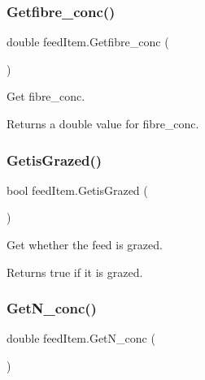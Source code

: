 \subsubsection{\texorpdfstring{Getfibre\_conc()}{Getfibre\_conc()}}
{\footnotesize\ttfamily double feed\+Item.\+Getfibre\+\_\+conc (\begin{DoxyParamCaption}{ }\end{DoxyParamCaption})\hspace{0.3cm}{\ttfamily [inline]}}



Get fibre\+\_\+conc. 

\begin{DoxyReturn}{Returns}
a double value for fibre\+\_\+conc. 
\end{DoxyReturn}
\mbox{\label{classfeed_item_a6e07dda15c41ded136ba5f52ccb263a6}} 
\subsubsection{\texorpdfstring{GetisGrazed()}{GetisGrazed()}}
{\footnotesize\ttfamily bool feed\+Item.\+Getis\+Grazed (\begin{DoxyParamCaption}{ }\end{DoxyParamCaption})\hspace{0.3cm}{\ttfamily [inline]}}



Get whether the feed is grazed. 

\begin{DoxyReturn}{Returns}
true if it is grazed. 
\end{DoxyReturn}
\mbox{\label{classfeed_item_ab292a740b8d19616f849e2aaa33f4884}} 
\subsubsection{\texorpdfstring{GetN\_conc()}{GetN\_conc()}}
{\footnotesize\ttfamily double feed\+Item.\+Get\+N\+\_\+conc (\begin{DoxyParamCaption}{ }\end{DoxyParamCaption})\hspace{0.3cm}{\ttfamily [inline]}}



